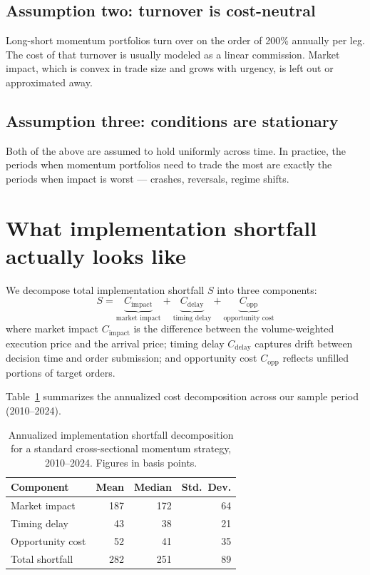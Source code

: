 \documentclass{scc}
\begin{document}
\subsection{Assumption two: turnover is cost-neutral}
Long-short momentum portfolios turn over on the order of 200\% annually per leg. The cost of that turnover is usually modeled as a linear commission. Market impact, which is convex in trade size and grows with urgency, is left out or approximated away.

\subsection{Assumption three: conditions are stationary}
Both of the above are assumed to hold uniformly across time. In practice, the periods when momentum portfolios need to trade the most are exactly the periods when impact is worst --- crashes, reversals, regime shifts.

\section{What implementation shortfall actually looks like}

We decompose total implementation shortfall $S$ into three components:
\begin{equation}
  S = \underbrace{C_{\text{impact}}}_{\text{market impact}}
    + \underbrace{C_{\text{delay}}}_{\text{timing delay}}
    + \underbrace{C_{\text{opp}}}_{\text{opportunity cost}}
\end{equation}
where market impact $C_{\text{impact}}$ is the difference between the volume-weighted execution price and the arrival price; timing delay $C_{\text{delay}}$ captures drift between decision time and order submission; and opportunity cost $C_{\text{opp}}$ reflects unfilled portions of target orders.

Table~\ref{tab:costs} summarizes the annualized cost decomposition across our sample period (2010--2024).

\begin{table}[ht]
  \centering
  \caption{Annualized implementation shortfall decomposition for a standard cross-sectional momentum strategy, 2010--2024. Figures in basis points.}
  \label{tab:costs}
  \begin{tabular}{lrrr}
    \toprule
    Component & Mean & Median & Std.~Dev. \\
    \midrule
    Market impact     & 187 & 172 & 64 \\
    Timing delay      &  43 &  38 & 21 \\
    Opportunity cost  &  52 &  41 & 35 \\
    \midrule
    Total shortfall   & 282 & 251 & 89 \\
    \bottomrule
  \end{tabular}
\end{table}
\end{document}
